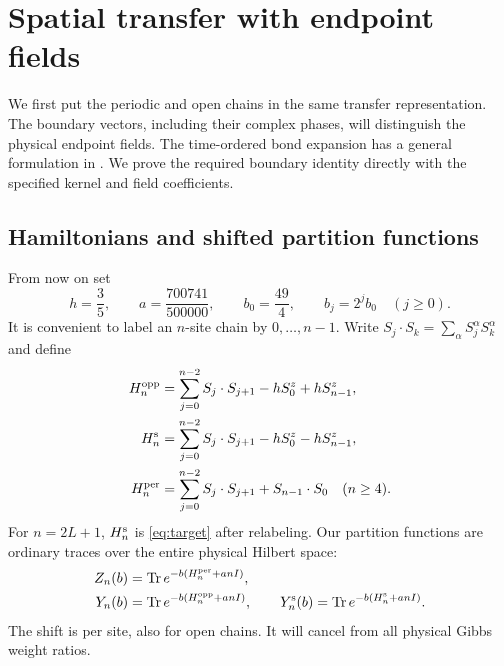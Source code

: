 \section{Spatial transfer with endpoint fields}\label{sec:transfer}
We first put the periodic and open chains in the same transfer
representation. The boundary vectors, including their complex phases,
will distinguish the physical endpoint fields.
The time-ordered bond expansion has a general formulation in
\cite[arXiv v1, Section 2.2, Equations (2.10)--(2.12)]{AizenmanNachtergaele1994}.
We prove the required boundary identity directly with the specified
kernel and field coefficients.

\subsection{Hamiltonians and shifted partition functions}
From now on set
\begin{equation}\label{tr:constants}
 h=\frac35,\qquad a=\frac{700741}{500000},\qquad
 b_0=\frac{49}{4},\qquad b_j=2^jb_0\quad(j\ge0).
\end{equation}
It is convenient to label an $n$-site chain by $0,\ldots,n-1$.
Write $S_j\cdot S_k=\sum_\alpha S_j^\alpha S_k^\alpha$ and define
\begin{align}
 H_n^{\rm opp}&=\sum_{j=0}^{n-2}S_j\cdot S_{j+1}
                         -hS_0^z+hS_{n-1}^z,\label{tr:Hopp}\\
 H_n^{\rm s}&=\sum_{j=0}^{n-2}S_j\cdot S_{j+1}
                         -hS_0^z-hS_{n-1}^z,\label{tr:Hsame}\\
 H_n^{\rm per}&=\sum_{j=0}^{n-2}S_j\cdot S_{j+1}
                         +S_{n-1}\cdot S_0\quad(n\ge4).
\end{align}
For $n=2L+1$, $H_n^{\rm s}$ is \eqref{eq:target} after relabeling.
Our partition functions are ordinary traces over the entire physical
Hilbert space:
\begin{equation}\label{tr:partitions}
 \begin{split}
 Z_n(b)&=\operatorname{Tr} e^{-b(H_n^{\rm per}+anI)},\\
 Y_n(b)&=\operatorname{Tr} e^{-b(H_n^{\rm opp}+anI)},\qquad
 Y_n^{\rm s}(b)=\operatorname{Tr} e^{-b(H_n^{\rm s}+anI)}.
 \end{split}
\end{equation}
The shift is per site, also for open chains. It will cancel from all
physical Gibbs weight ratios.

